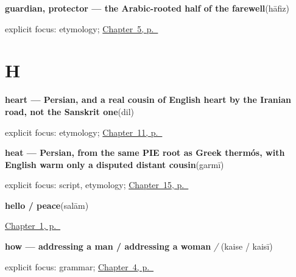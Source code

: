 \noindent\begin{minipage}[t]{\linewidth}
\raggedright
\textbf{guardian, protector — the Arabic-rooted half of the farewell}\enspace\emph{}\enspace(hāfiz)\par
\footnotesize explicit focus: etymology; \hyperref[ch:ur-take-leave]{Chapter~5, p.~\pageref*{ch:ur-take-leave}}
\end{minipage}\par\smallskip

\section*{H}

\noindent\begin{minipage}[t]{\linewidth}
\raggedright
\textbf{heart — Persian, and a real cousin of English heart by the Iranian road, not the Sanskrit one}\enspace\emph{}\enspace(dil)\par
\footnotesize explicit focus: etymology; \hyperref[ch:ur-heart]{Chapter~11, p.~\pageref*{ch:ur-heart}}
\end{minipage}\par\smallskip

\noindent\begin{minipage}[t]{\linewidth}
\raggedright
\textbf{heat — Persian, from the same PIE root as Greek thermós, with English warm only a disputed distant cousin}\enspace\emph{}\enspace(garmī)\par
\footnotesize explicit focus: script, etymology; \hyperref[ch:ur-weather]{Chapter~15, p.~\pageref*{ch:ur-weather}}
\end{minipage}\par\smallskip

\noindent\begin{minipage}[t]{\linewidth}
\raggedright
\textbf{hello / peace}\enspace\emph{}\enspace(salām)\par
\footnotesize \hyperref[ch:urdu-greetings]{Chapter~1, p.~\pageref*{ch:urdu-greetings}}
\end{minipage}\par\smallskip

\noindent\begin{minipage}[t]{\linewidth}
\raggedright
\textbf{how — addressing a man / addressing a woman}\enspace\emph{ / }\enspace(kaise / kaisī)\par
\footnotesize explicit focus: grammar; \hyperref[ch:ur-how-are-you]{Chapter~4, p.~\pageref*{ch:ur-how-are-you}}
\end{minipage}\par\smallskip

